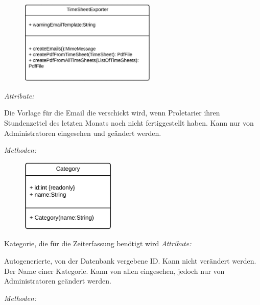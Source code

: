 \begin{itemize}
                \begin{figure}[htb]
                \centering
                \includegraphics[width=6.5cm]{Diagramms/class/singleclass/TimeSheetExp.pdf}
                \end{figure}
                \newline
                \emph{Attribute:}
                \begin{itemize}
                        Die Vorlage für die Email die verschickt wird, wenn Proletarier ihren Stundenzettel des letzten Monats noch nicht fertiggestellt haben.
                        Kann nur von Administratoren eingesehen und geändert werden.
                \end{itemize}
                \emph{Methoden:}
                \begin{itemize}
                \end{itemize}

            \newpage
                \begin{figure}[htb]
                \centering
                \includegraphics[width=4.5cm]{Diagramms/class/singleclass/Cat.pdf}
                \end{figure}
                \newline
                Kategorie, die für die Zeiterfassung benötigt wird
                \emph{Attribute:}
                \begin{itemize}
                        Autogenerierte, von der Datenbank vergebene ID.
                        Kann nicht verändert werden.
                        Der Name einer Kategorie.
                        Kann von allen eingesehen, jedoch nur von Administratoren geändert werden.
                \end{itemize}
                \emph{Methoden:}
                \begin{itemize}
                \end{itemize}


\end{itemize}

